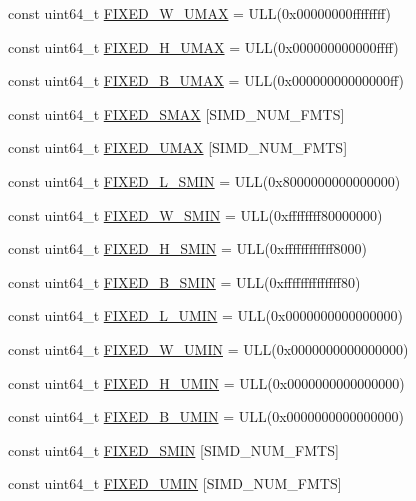 \begin{DoxyCompactItemize}
\item 
const uint64\_\-t \hyperlink{namespaceMipsISA_a9fdc649ad8c150d9cb5969a6cef7b9af}{FIXED\_\-W\_\-UMAX} = ULL(0x00000000ffffffff)
\item 
const uint64\_\-t \hyperlink{namespaceMipsISA_a9fe6e8880110446df9f2b48464395dc8}{FIXED\_\-H\_\-UMAX} = ULL(0x000000000000ffff)
\item 
const uint64\_\-t \hyperlink{namespaceMipsISA_ab35e34bc34906681016d591f07fa8388}{FIXED\_\-B\_\-UMAX} = ULL(0x00000000000000ff)
\item 
const uint64\_\-t \hyperlink{namespaceMipsISA_ab0e1ac60266a62ef6254becec7c6735f}{FIXED\_\-SMAX} \mbox{[}SIMD\_\-NUM\_\-FMTS\mbox{]}
\item 
const uint64\_\-t \hyperlink{namespaceMipsISA_af1e0a1b1164ae2aed24ee07342194d8c}{FIXED\_\-UMAX} \mbox{[}SIMD\_\-NUM\_\-FMTS\mbox{]}
\item 
const uint64\_\-t \hyperlink{namespaceMipsISA_ad3ea7f4d56d3f8388849a08240cca8ba}{FIXED\_\-L\_\-SMIN} = ULL(0x8000000000000000)
\item 
const uint64\_\-t \hyperlink{namespaceMipsISA_a233a552996272d5c1b73f53d1ffd17de}{FIXED\_\-W\_\-SMIN} = ULL(0xffffffff80000000)
\item 
const uint64\_\-t \hyperlink{namespaceMipsISA_ae673d35643dfe81498cbf17a7e9cd587}{FIXED\_\-H\_\-SMIN} = ULL(0xffffffffffff8000)
\item 
const uint64\_\-t \hyperlink{namespaceMipsISA_a4e61092133665f4dee5dc4f839b9b3c0}{FIXED\_\-B\_\-SMIN} = ULL(0xffffffffffffff80)
\item 
const uint64\_\-t \hyperlink{namespaceMipsISA_a3f3ee51cb5f4d1e09a5b0657804afaec}{FIXED\_\-L\_\-UMIN} = ULL(0x0000000000000000)
\item 
const uint64\_\-t \hyperlink{namespaceMipsISA_adabc2493e3927f0cbddbd225dbb192a3}{FIXED\_\-W\_\-UMIN} = ULL(0x0000000000000000)
\item 
const uint64\_\-t \hyperlink{namespaceMipsISA_a122eaef6c15e79b76c40d39b5090c7b1}{FIXED\_\-H\_\-UMIN} = ULL(0x0000000000000000)
\item 
const uint64\_\-t \hyperlink{namespaceMipsISA_a7982d3f6b301b728e3ce73462cc8bb9a}{FIXED\_\-B\_\-UMIN} = ULL(0x0000000000000000)
\item 
const uint64\_\-t \hyperlink{namespaceMipsISA_aaf5085bdcb1ce2a10d64f7b17b6f46fe}{FIXED\_\-SMIN} \mbox{[}SIMD\_\-NUM\_\-FMTS\mbox{]}
\item 
const uint64\_\-t \hyperlink{namespaceMipsISA_aeab1d8da14eb0f232765217502c593da}{FIXED\_\-UMIN} \mbox{[}SIMD\_\-NUM\_\-FMTS\mbox{]}

\end{DoxyCompactItemize}
